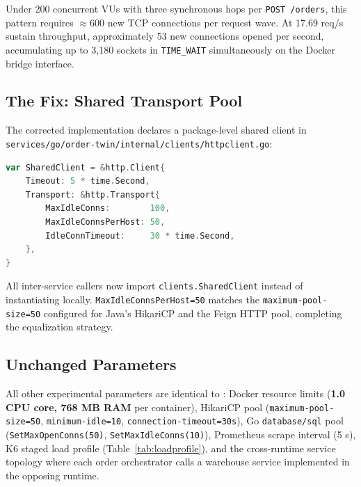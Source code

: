 \documentclass[conference]{IEEEtran}
\begin{document}
Under 200 concurrent VUs with three synchronous hops per \texttt{POST /orders}, this pattern requires $\approx$600 new TCP connections per request wave. At 17.69 req/s sustain throughput, approximately 53 new connections opened per second, accumulating up to 3,180 sockets in \texttt{TIME\_WAIT} simultaneously on the Docker bridge interface.

\subsection{The Fix: Shared Transport Pool}

The corrected implementation declares a package-level shared client in \texttt{services/go/order-twin/internal/clients/httpclient.go}:

\begin{lstlisting}[language=Go, caption={Corrected Go HTTP client with shared transport pool}, label={lst:gonew}]
var SharedClient = &http.Client{
    Timeout: 5 * time.Second,
    Transport: &http.Transport{
        MaxIdleConns:        100,
        MaxIdleConnsPerHost: 50,
        IdleConnTimeout:     30 * time.Second,
    },
}
\end{lstlisting}

All inter-service callers now import \texttt{clients.SharedClient} instead of instantiating locally. \texttt{MaxIdleConnsPerHost=50} matches the \texttt{maximum-pool-size=50} configured for Java's HikariCP and the Feign HTTP pool, completing the equalization strategy.

\subsection{Unchanged Parameters}

All other experimental parameters are identical to \cite{b10}: Docker resource limits (\textbf{1.0 CPU core, 768 MB RAM} per container), HikariCP pool (\texttt{maximum-pool-size=50}, \texttt{minimum-idle=10}, \texttt{connection-timeout=30s}), Go \texttt{database/sql} pool (\texttt{SetMaxOpenConns(50)}, \texttt{SetMaxIdleConns(10)}), Prometheus scrape interval (5 s), K6 staged load profile (Table~\ref{tab:loadprofile}), and the cross-runtime service topology where each order orchestrator calls a warehouse service implemented in the opposing runtime.
\end{document}
